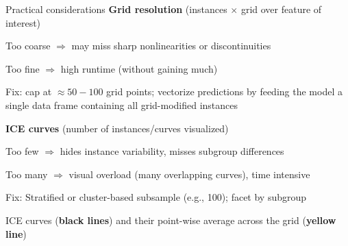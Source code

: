 \documentclass[10pt,compress,t,notes=noshow, xcolor=table]{beamer}
\begin{document}
\begin{framev}[align=top]{Practical considerations}
\textbf{Grid resolution} (instances $\times$ grid over feature of interest)
\begin{itemizeM}
\item Too coarse $\Rightarrow$ may miss sharp nonlinearities or discontinuities
\item Too fine $\Rightarrow$ high runtime (without gaining much)
\item Fix: cap at $\approx 50 - 100$ grid points; vectorize predictions by feeding the model a single data frame containing all grid-modified instances
\end{itemizeM}
\textbf{ICE curves} (number of instances/curves visualized)
\begin{itemizeM}
\item Too few $\Rightarrow$ hides instance variability, misses subgroup differences
\item Too many $\Rightarrow$ visual overload (many overlapping curves), time intensive%
\item Fix: Stratified or cluster-based subsample (e.g., 100); facet by subgroup
\end{itemizeM}
{\centering
\begin{small}
ICE curves (\textbf{black lines}) and their point-wise average across the grid (\textbf{yellow line})%
\end{small}
\par}
\end{framev}

\endlecture
\end{document}
